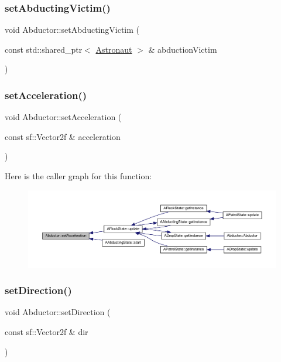 \subsubsection{\texorpdfstring{set\+Abducting\+Victim()}{setAbductingVictim()}}
{\footnotesize\ttfamily void Abductor\+::set\+Abducting\+Victim (\begin{DoxyParamCaption}\item[{const std\+::shared\+\_\+ptr$<$ \hyperlink{class_astronaut}{Astronaut} $>$ \&}]{abduction\+Victim }\end{DoxyParamCaption})}

\mbox{\label{class_abductor_a7147793ce13d446f83eb52920dfa15f7}} 
\subsubsection{\texorpdfstring{set\+Acceleration()}{setAcceleration()}}
{\footnotesize\ttfamily void Abductor\+::set\+Acceleration (\begin{DoxyParamCaption}\item[{const sf\+::\+Vector2f \&}]{acceleration }\end{DoxyParamCaption})}

Here is the caller graph for this function\+:
\nopagebreak
\begin{figure}[H]
\begin{center}
\leavevmode
\includegraphics[width=350pt]{class_abductor_a7147793ce13d446f83eb52920dfa15f7_icgraph}
\end{center}
\end{figure}
\mbox{\label{class_abductor_aad7a615477ffe510984c8df16e98c903}} 
\subsubsection{\texorpdfstring{set\+Direction()}{setDirection()}}
{\footnotesize\ttfamily void Abductor\+::set\+Direction (\begin{DoxyParamCaption}\item[{const sf\+::\+Vector2f \&}]{dir }\end{DoxyParamCaption})}

